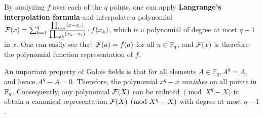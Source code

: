 By analyzing $f$ over each of the $q$ points, one can apply
{\bf Langrange's interpolation formula} and interpolate a polynomial
${\mathcal{F}}(x) = \sum_{k=1} ^q  \frac{ \prod_{i \neq k}  (x -x_i)}{\prod_{i \neq k}
  (x_k -x_i)} \cdot f(x_k)$, which is a polynomial of degree at 
most $q-1$ in $x$. One can easily see that ${\mathcal{F}}(a)=f(a)$ for all $a \in
{\mathbb{F}}_{q}$, and ${\mathcal{F}}(x)$ is therefore the polynomial function representation
of $f$. 




An important property of Galois fields is that for all elements $A \in
{\mathbb{F}}_q, A^q = A$, and hence $A^q - A =  0.$ Therefore, the
polynomial $x^q -x$ {\it vanishes} on all points in
${\mathbb{F}}_{q}$. Consequently, any polynomial ${\mathcal{F}}(X)$ can be reduced $\pmod{ X^q
  - X}$ to obtain a canonical representation ${\mathcal{F}}(X) \pmod{X^q - X}$
with degree at most $q-1$. 


